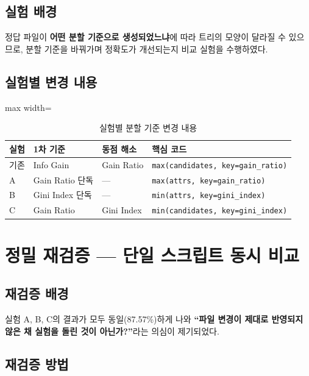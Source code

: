 \documentclass[12pt, a4paper]{article}
\begin{document}
\subsection{실험 배경}

정답 파일이 \textbf{어떤 분할 기준으로 생성되었느냐}에 따라 트리의 모양이 달라질 수 있으므로,
분할 기준을 바꿔가며 정확도가 개선되는지 비교 실험을 수행하였다.

\subsection{실험별 변경 내용}

\begin{table}[h]
\centering
\begin{adjustbox}{max width=\textwidth}
\begin{tabular}{lllp{6cm}}
\toprule
\textbf{실험} & \textbf{1차 기준} & \textbf{동점 해소} & \textbf{핵심 코드} \\
\midrule
기존   & Info Gain        & Gain Ratio   & \texttt{max(candidates, key=gain\_ratio)} \\
A      & Gain Ratio 단독  & ---          & \texttt{max(attrs, key=gain\_ratio)} \\
B      & Gini Index 단독  & ---          & \texttt{min(attrs, key=gini\_index)} \\
C      & Gain Ratio       & Gini Index   & \texttt{min(candidates, key=gini\_index)} \\
\bottomrule
\end{tabular}
\end{adjustbox}
\caption{실험별 분할 기준 변경 내용}
\end{table}


\section{정밀 재검증 --- 단일 스크립트 동시 비교}

\subsection{재검증 배경}

실험 A, B, C의 결과가 모두 동일(87.57\%)하게 나와 \textbf{``파일 변경이 제대로 반영되지 않은 채 실험을 돌린 것이 아닌가?''}라는 의심이 제기되었다.

\subsection{재검증 방법}
\end{document}
